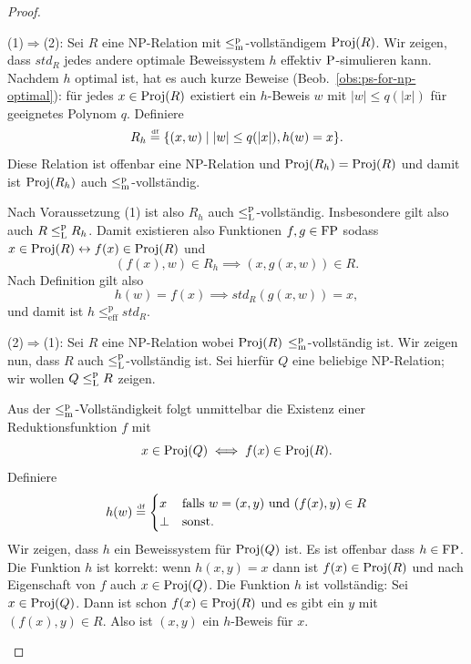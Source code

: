 \begin{proof}
    \begin{prooflist}[label={}]
    \item (1)$\Rightarrow$(2): 
        Sei $R$ eine NP-Relation mit $\leqmp$-vollständigem $\Proj(R)$.
    Wir zeigen, dass $\mathit{std}_{R}$ jedes andere optimale Beweissystem $h$ effektiv $\P$-simulieren kann.
    Nachdem $h$ optimal ist, hat es auch kurze Beweise (Beob.~\ref{obs:ps-for-np-optimal}): für jedes $x\in\Proj(R)$ existiert ein $h$-Beweis $w$ mit $|w|\leq q(|x|)$ für geeignetes Polynom $q$.  Definiere
    \[ R_h \defeq \{ (x, w) \mid |w|\leq q(|x|), h(w) = x\}. \]
    Diese Relation ist offenbar eine NP-Relation und $\Proj(R_h) = \Proj(R)$ und damit ist $\Proj(R_h)$ auch $\leqmp$-vollständig. 

    Nach Voraussetzung (1) ist also  $R_h$ auch $\leqlp$-vollständig.
    Insbesondere gilt also  auch $R \leqlp R_h$. Damit existieren also Funktionen $f,g\in\FP$ sodass
    $x\in \Proj(R) \leftrightarrow f(x)\in\Proj(R)$ und
    \[ (f(x), w) \in R_h \implies (x, g(x, w))\in R. \]
    Nach Definition gilt also 
    \[ h(w)=f(x) \implies \mathit{std}_R(g(x, w)) = x, \]
    und damit ist $h\leq^\mathrm p_\mathrm{eff} \mathit{std}_R$.

\item (2)$\Rightarrow$(1): 
    Sei $R$ eine NP-Relation wobei $\Proj(R)$ $\leqmp$-vollständig ist. Wir zeigen nun, dass $R$ auch $\leqlp$-vollständig ist.
    Sei hierfür $Q$ eine beliebige NP-Relation; wir wollen $Q\leqlp R$ zeigen.

    Aus der $\leqmp$-Vollständigkeit folgt unmittelbar die Existenz einer Reduktionsfunktion $f$ mit 
    \[ x\in \Proj(Q) \iff f(x) \in \Proj(R). \]
    Definiere
    \[ h(w) \defeq \begin{cases} x & \text{falls $w=(x,y)$ und $(f(x),y)\in R$} \\ \bot & \text{sonst.} \end{cases} \]
    Wir zeigen, dass $h$ ein Beweissystem für $\Proj(Q)$ ist. Es ist offenbar dass $h\in\FP$. Die Funktion $h$ ist korrekt: wenn $h(x,y)=x$ dann ist $f(x)\in\Proj(R)$ und nach Eigenschaft von $f$ auch $x\in\Proj(Q)$.
    Die Funktion $h$ ist vollständig: Sei $x\in\Proj(Q)$. Dann ist schon $f(x)\in\Proj(R)$ und es gibt ein $y$ mit $(f(x),y)\in R$. Also ist $(x,y)$ ein $h$-Beweis für $x$.


\end{prooflist}
\end{proof}
